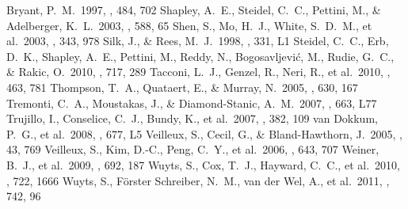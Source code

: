 \documentclass[apj]{emulateapj}
\begin{document}
\begin{thebibliography}{}
  Bryant, P.~M.\ 1997, \apj, 484, 702
 Shapley, A.~E., Steidel, C.~C.,
  Pettini, M., \& Adelberger, K.~L.\ 2003, \apj, 588, 65
 Shen, S., Mo, H.~J., White,
  S.~D.~M., et al.\ 2003, \mnras, 343, 978
 Silk, J., \& Rees, M.~J.\ 1998,
  \aap, 331, L1
 Steidel, C.~C., Erb, D.~K.,
  Shapley, A.~E., Pettini, M., Reddy, N., Bogosavljevi{\'c}, M.,
  Rudie, G.~C., \& Rakic, O.\ 2010, \apj, 717, 289
 Tacconi, L.~J., Genzel, R.,
  Neri, R., et al.\ 2010, \nat, 463, 781
 Thompson, T.~A., Quataert, E.,
  \& Murray, N.\ 2005, \apj, 630, 167
 Tremonti, C.~A., Moustakas, J.,
  \& Diamond-Stanic, A.~M.\ 2007, \apjl, 663, L77
 Trujillo, I., Conselice, C.~J.,
  Bundy, K., et al.\ 2007, \mnras, 382, 109
 van Dokkum, P.~G., et
  al.\ 2008, \apjl, 677, L5
 Veilleux, S., Cecil, G., \&
  Bland-Hawthorn, J.\ 2005, \araa, 43, 769
 Veilleux, S., Kim, D.-C., Peng,
  C.~Y., et al.\ 2006, \apj, 643, 707
 Weiner, B.~J., et al.\ 2009,
  \apj, 692, 187
 Wuyts, S., Cox, T.~J., Hayward,
  C.~C., et al.\ 2010, \apj, 722, 1666
 Wuyts, S., F{\"o}rster Schreiber,
  N.~M., van der Wel, A., et al.\ 2011, \apj, 742, 96
\end{thebibliography}
\end{document}
